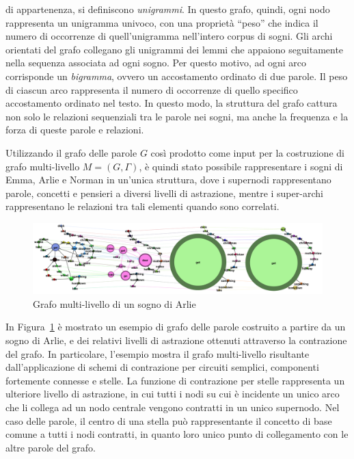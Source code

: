 \begin{enumerate}
          di appartenenza, si definiscono \textit{unigrammi}. In questo grafo, quindi, ogni nodo rappresenta
          un unigramma univoco, con una proprietà ``peso'' che indica il numero di occorrenze di quell'unigramma
          nell'intero corpus di sogni.
          Gli archi orientati del grafo collegano gli unigrammi dei lemmi che appaiono seguitamente nella
          sequenza associata ad ogni sogno.
          Per questo motivo, ad ogni arco corrisponde un \textit{bigramma}, ovvero un accostamento ordinato di due parole.
          Il peso di ciascun arco rappresenta il numero di occorrenze di quello specifico accostamento ordinato nel testo.
          In questo modo, la struttura del grafo cattura non solo le relazioni sequenziali tra le parole nei sogni,
          ma anche la frequenza e la forza di queste parole e relazioni.
\end{enumerate}

Utilizzando il grafo delle parole $G$ così prodotto come input per la costruzione di grafo multi-livello
$M = (G, \Gamma)$, è quindi stato possibile rappresentare i sogni di Emma, Arlie e Norman in un'unica struttura,
dove i supernodi rappresentano parole, concetti e pensieri a diversi livelli di astrazione, mentre i super-archi
rappresentano le relazioni tra tali elementi quando sono correlati.

\begin{figure}
    \centering
    \includegraphics[width=1\textwidth]{Immagini/arlie_dream_graph_example}
    \caption{Grafo multi-livello di un sogno di Arlie}
    \label{fig:arlie-dream-graph}
\end{figure}

In Figura~\ref{fig:arlie-dream-graph} è mostrato un esempio di grafo delle parole costruito a partire da un sogno di Arlie, e dei
relativi livelli di astrazione ottenuti attraverso la contrazione del grafo.
In particolare, l'esempio mostra il grafo multi-livello risultante dall'applicazione di schemi di contrazione per
circuiti semplici, componenti fortemente connesse e stelle.
La funzione di contrazione per stelle rappresenta un ulteriore livello di astrazione, in cui tutti i nodi su cui è
incidente un unico arco che li collega ad un nodo centrale vengono contratti in un unico supernodo.
Nel caso delle parole, il centro di una stella può rappresentante il concetto di base comune a tutti i nodi contratti,
in quanto loro unico punto di collegamento con le altre parole del grafo.


